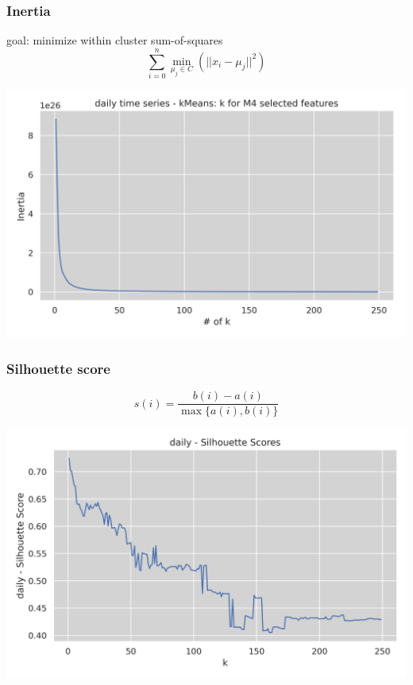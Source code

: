 \documentclass[11pt]{article}
\begin{document}
\subsubsection*{Inertia}
\label{sec:org8426905}
goal: minimize within cluster sum-of-squares
  $$ \sum_{i=0}^n \min_{\mu_j \in C}(\lvert \lvert x_i - \mu_j \rvert \rvert^2) $$
\begin{center}
\includegraphics[width=500px]{../img/daily_kmeans_series_inertia.png}
\end{center}
\subsubsection*{Silhouette score}
\label{sec:orgb597cb8}
$$ s(i) = \frac{b(i) - a(i)}{{\max\{a(i),b(i)\}}} $$
  \begin{center}
\includegraphics[width=.9\linewidth]{../img/daily_kmeans_sil_score_series.png}
\end{center}
\end{document}
